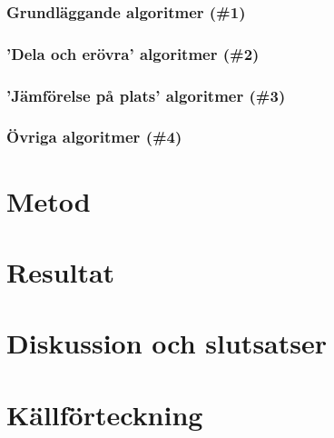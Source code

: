 \documentclass[twocolumn, a4, twoside]{article}
\begin{document}
\subsubsection{Grundläggande algoritmer (\#1)}

\subsubsection{'Dela och erövra' algoritmer (\#2)}

\subsubsection{'Jämförelse på plats' algoritmer (\#3)}

\subsubsection{Övriga algoritmer (\#4)}

\section{Metod}

\section{Resultat}

\section{Diskussion och slutsatser}

\onecolumn
\newpage
\section{Källförteckning}
\printbibliography
\end{document}
